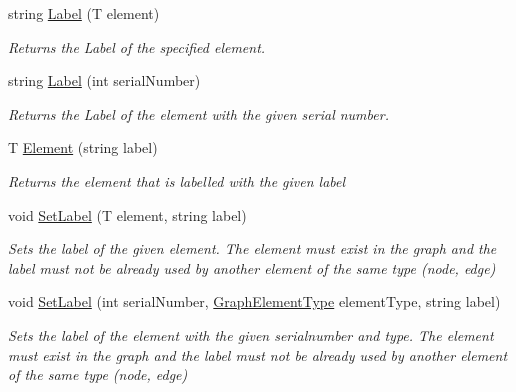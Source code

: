 \begin{DoxyCompactItemize}
\item 
string \hyperlink{interface_graph_library_1_1_generics_1_1_i_graph_labeling_a2904d32c62f983b7afd6703ba8922a7b}{Label} (T element)
\begin{DoxyCompactList}\small\item\em Returns the Label of the specified element. \end{DoxyCompactList}\item 
string \hyperlink{interface_graph_library_1_1_generics_1_1_i_graph_labeling_a9f5aa9fd0ae47e9ba13845eb3ca71fe3}{Label} (int serial\+Number)
\begin{DoxyCompactList}\small\item\em Returns the Label of the element with the given serial number. \end{DoxyCompactList}\item 
T \hyperlink{interface_graph_library_1_1_generics_1_1_i_graph_labeling_a4d45b0ba9ac709dcabadab1d69cef8f1}{Element} (string label)
\begin{DoxyCompactList}\small\item\em Returns the element that is labelled with the given label \end{DoxyCompactList}\item 
void \hyperlink{interface_graph_library_1_1_generics_1_1_i_graph_labeling_a46bec4e7f765d5e6ede5e758cee4145a}{Set\+Label} (T element, string label)
\begin{DoxyCompactList}\small\item\em Sets the label of the given element. The element must exist in the graph and the label must not be already used by another element of the same type (node, edge) \end{DoxyCompactList}\item 
void \hyperlink{interface_graph_library_1_1_generics_1_1_i_graph_labeling_ab5abcba5824c65ffb695aba813b06a8e}{Set\+Label} (int serial\+Number, \hyperlink{namespace_graph_library_1_1_generics_a919a165f16deccdd1b3d7e8a93423fbc}{Graph\+Element\+Type} element\+Type, string label)
\begin{DoxyCompactList}\small\item\em Sets the label of the element with the given serialnumber and type. The element must exist in the graph and the label must not be already used by another element of the same type (node, edge) \end{DoxyCompactList}\end{DoxyCompactItemize}


